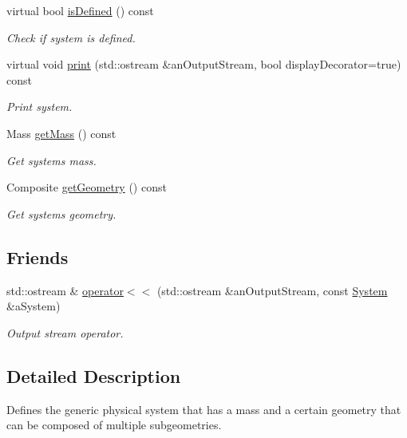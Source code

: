 \begin{DoxyCompactItemize}
virtual bool \hyperlink{classostk_1_1astro_1_1flight_1_1_system_a45d6ad6bca50c0d9cb9b50135ed2efa3}{is\+Defined} () const
\begin{DoxyCompactList}\small\item\em Check if system is defined. \end{DoxyCompactList}\item 
virtual void \hyperlink{classostk_1_1astro_1_1flight_1_1_system_a24d1aacf9355f5ee56fa56eeabe231ab}{print} (std\+::ostream \&an\+Output\+Stream, bool display\+Decorator=true) const
\begin{DoxyCompactList}\small\item\em Print system. \end{DoxyCompactList}\item 
Mass \hyperlink{classostk_1_1astro_1_1flight_1_1_system_a5c83b22d462c5d4b3f9766430c17d646}{get\+Mass} () const
\begin{DoxyCompactList}\small\item\em Get system\textquotesingle{}s mass. \end{DoxyCompactList}\item 
Composite \hyperlink{classostk_1_1astro_1_1flight_1_1_system_ac50685f33e3442384ed41b3b8c2d6549}{get\+Geometry} () const
\begin{DoxyCompactList}\small\item\em Get system\textquotesingle{}s geometry. \end{DoxyCompactList}\end{DoxyCompactItemize}
\subsection*{Friends}
\begin{DoxyCompactItemize}
\item 
std\+::ostream \& \hyperlink{classostk_1_1astro_1_1flight_1_1_system_aaf88422b640217e9e1c2c354a7e05634}{operator$<$$<$} (std\+::ostream \&an\+Output\+Stream, const \hyperlink{classostk_1_1astro_1_1flight_1_1_system}{System} \&a\+System)
\begin{DoxyCompactList}\small\item\em Output stream operator. \end{DoxyCompactList}\end{DoxyCompactItemize}


\subsection{Detailed Description}
Defines the generic physical system that has a mass and a certain geometry that can be composed of multiple subgeometries. 

